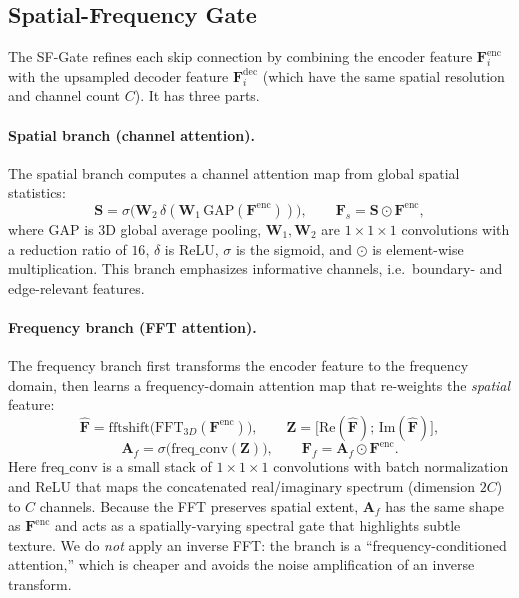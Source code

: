 \documentclass{article}
\begin{document}
\subsection{Spatial-Frequency Gate}

The SF-Gate refines each skip connection by combining the encoder feature $\mathbf{F}^{\mathrm{enc}}_{i}$ with the upsampled decoder feature $\mathbf{F}^{\mathrm{dec}}_{i}$ (which have the same spatial resolution and channel count $C$). It has three parts.

\paragraph{Spatial branch (channel attention).}
The spatial branch computes a channel attention map from global spatial statistics:
\begin{equation}
  \mathbf{S} = \sigma\big(\mathbf{W}_{2}\,\delta(\mathbf{W}_{1}\,\mathrm{GAP}(\mathbf{F}^{\mathrm{enc}}))\big),
  \qquad
  \mathbf{F}_{s} = \mathbf{S} \odot \mathbf{F}^{\mathrm{enc}},
\end{equation}
where $\mathrm{GAP}$ is 3D global average pooling, $\mathbf{W}_{1},\mathbf{W}_{2}$ are $1\times1\times1$ convolutions with a reduction ratio of $16$, $\delta$ is ReLU, $\sigma$ is the sigmoid, and $\odot$ is element-wise multiplication. This branch emphasizes informative channels, i.e.\ boundary- and edge-relevant features.

\paragraph{Frequency branch (FFT attention).}
The frequency branch first transforms the encoder feature to the frequency domain, then learns a frequency-domain attention map that re-weights the \emph{spatial} feature:
\begin{equation}
  \hat{\mathbf{F}} = \mathrm{fftshift}\big(\mathrm{FFT}_{3D}(\mathbf{F}^{\mathrm{enc}})\big),
  \qquad
  \mathbf{Z} = \big[\mathrm{Re}(\hat{\mathbf{F}});\,\mathrm{Im}(\hat{\mathbf{F}})\big],
\end{equation}
\begin{equation}
  \mathbf{A}_{f} = \sigma\big(\mathrm{freq\_conv}(\mathbf{Z})\big),
  \qquad
  \mathbf{F}_{f} = \mathbf{A}_{f} \odot \mathbf{F}^{\mathrm{enc}}.
\end{equation}
Here $\mathrm{freq\_conv}$ is a small stack of $1\times1\times1$ convolutions with batch normalization and ReLU that maps the concatenated real/imaginary spectrum (dimension $2C$) to $C$ channels. Because the FFT preserves spatial extent, $\mathbf{A}_{f}$ has the same shape as $\mathbf{F}^{\mathrm{enc}}$ and acts as a spatially-varying spectral gate that highlights subtle texture. We do \emph{not} apply an inverse FFT: the branch is a ``frequency-conditioned attention,'' which is cheaper and avoids the noise amplification of an inverse transform.
\end{document}
